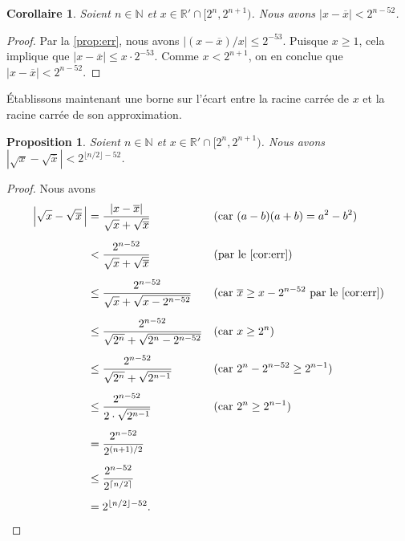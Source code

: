 \documentclass{article}
\newcommand{\N}{\mathbb{N}}
\newcommand{\R}{\mathbb{R}}
\newtheorem{proposition}[theorem]{Proposition}
\newtheorem{corollaire}[theorem]{Corollaire}
\begin{document}
\begin{corollaire}\label{cor:err}
  Soient $n \in \N$ et $x \in \R' \cap [2^n, 2^{n+1})$. Nous avons $|x
    - \overline{x}| < 2^{n - 52}$.
\end{corollaire}

\begin{proof}
  Par la \cref{prop:err}, nous avons $|(x - \overline{x}) / x| \leq
  2^{-53}$. Puisque $x \geq 1$, cela implique que $|x - \overline{x}|
  \leq x \cdot 2^{-53}$. Comme $x < 2^{n+1}$, on en conclue que $|x -
  \overline{x}| < 2^{n - 52}$.
\end{proof}

Établissons maintenant une borne sur l'écart entre la racine carrée de
$x$ et la racine carrée de son approximation.

\begin{proposition}\label{prop:borne}
  Soient $n \in \N$ et $x \in \R' \cap [2^n, 2^{n+1})$. Nous avons
    $|\sqrt{x} - \sqrt{\overline{x}}| < 2^{\lfloor n/2 \rfloor - 52}$.
\end{proposition}

\begin{proof}
  Nous avons
  \begin{align*}
    \left|\sqrt{x} - \sqrt{\overline{x}}\,\right|
    &= \frac{|x - \overline{x}|}{\sqrt{x} + \sqrt{\overline{x}}}
    && \text{(car $(a - b)(a + b) = a^2 - b^2$)} \\[5pt]
    &< \frac{2^{n-52}}{\sqrt{x} + \sqrt{\overline{x}}}
    && \text{(par le \cref{cor:err})} \\[5pt]
    &\leq \frac{2^{n-52}}{\sqrt{x} + \sqrt{x - 2^{n - 52}}}
    && \text{(car $\overline{x} \geq x - 2^{n - 52}$ par le \cref{cor:err})} \\[5pt]
    &\leq \frac{2^{n-52}}{\sqrt{2^n} + \sqrt{2^n - 2^{n - 52}}}
    && \text{(car $x \geq 2^n$)} \\[5pt]
    &\leq \frac{2^{n-52}}{\sqrt{2^n} + \sqrt{2^{n-1}}}
    && \text{(car $2^n - 2^{n - 52} \geq 2^{n-1}$)} \\[5pt]
    &\leq \frac{2^{n-52}}{2 \cdot \sqrt{2^{n-1}}}
    && \text{(car $2^n \geq 2^{n-1}$)} \\[5pt]
    &= \frac{2^{n-52}}{2^{(n+1)/2}} \\[5pt]
    &\leq \frac{2^{n-52}}{2^{\lceil n /2 \rceil}} \\[5pt]
    &= 2^{\lfloor n /2 \rfloor - 52}.
    && \qedhere
  \end{align*}
\end{proof}
\end{document}
